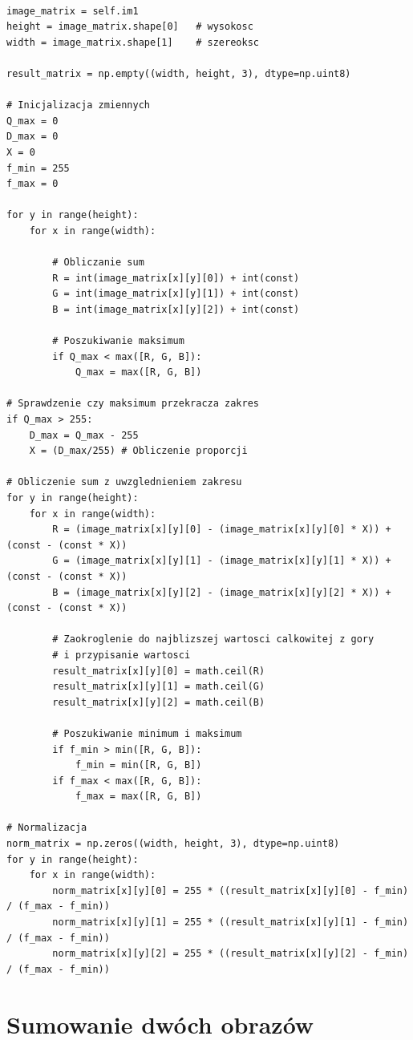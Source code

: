 \documentclass[final,a4paper,openany,12pt]{mwbk}
\begin{document}
\begin{lstlisting}[caption=Sumowanie obrazu barwowego ze stałą]

image_matrix = self.im1
height = image_matrix.shape[0]   # wysokosc
width = image_matrix.shape[1]    # szereoksc

result_matrix = np.empty((width, height, 3), dtype=np.uint8)

# Inicjalizacja zmiennych
Q_max = 0
D_max = 0
X = 0
f_min = 255
f_max = 0

for y in range(height):
    for x in range(width):  

        # Obliczanie sum
        R = int(image_matrix[x][y][0]) + int(const)
        G = int(image_matrix[x][y][1]) + int(const)
        B = int(image_matrix[x][y][2]) + int(const)

        # Poszukiwanie maksimum               
        if Q_max < max([R, G, B]):
            Q_max = max([R, G, B])

# Sprawdzenie czy maksimum przekracza zakres
if Q_max > 255:
    D_max = Q_max - 255
    X = (D_max/255) # Obliczenie proporcji

# Obliczenie sum z uwzglednieniem zakresu
for y in range(height):
    for x in range(width): 
        R = (image_matrix[x][y][0] - (image_matrix[x][y][0] * X)) + (const - (const * X))
        G = (image_matrix[x][y][1] - (image_matrix[x][y][1] * X)) + (const - (const * X))
        B = (image_matrix[x][y][2] - (image_matrix[x][y][2] * X)) + (const - (const * X))

        # Zaokroglenie do najblizszej wartosci calkowitej z gory
        # i przypisanie wartosci
        result_matrix[x][y][0] = math.ceil(R)
        result_matrix[x][y][1] = math.ceil(G)
        result_matrix[x][y][2] = math.ceil(B)

        # Poszukiwanie minimum i maksimum                
        if f_min > min([R, G, B]):
            f_min = min([R, G, B])
        if f_max < max([R, G, B]):
            f_max = max([R, G, B])

# Normalizacja
norm_matrix = np.zeros((width, height, 3), dtype=np.uint8)
for y in range(height):
    for x in range(width):
        norm_matrix[x][y][0] = 255 * ((result_matrix[x][y][0] - f_min) / (f_max - f_min))
        norm_matrix[x][y][1] = 255 * ((result_matrix[x][y][1] - f_min) / (f_max - f_min))
        norm_matrix[x][y][2] = 255 * ((result_matrix[x][y][2] - f_min) / (f_max - f_min))
\end{lstlisting}

\section {Sumowanie dwóch obrazów}
\hfill
\\\\
\indent
\end{document}
